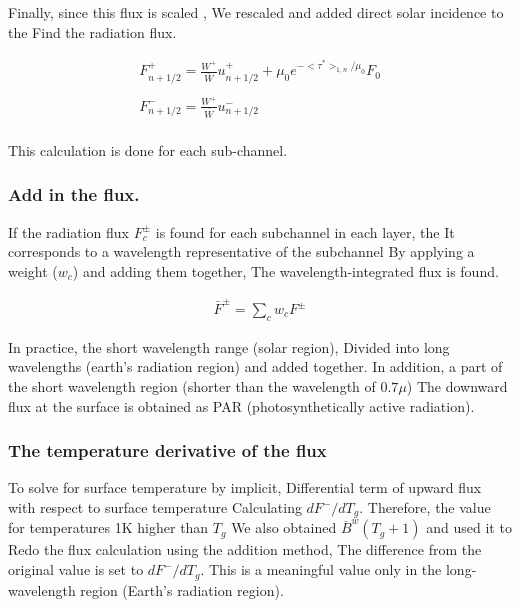 Finally, since this flux is scaled , We rescaled and added direct solar
incidence to the Find the radiation flux.

\begin{eqnarray}
  F^+_{n+1/2}  =  \frac{W^+}{\bar{W}} u^+_{n+1/2} 
                + \mu_0 e^{-<\tau^*>_{1,n}/\mu_0} F_0 \\\\
  F^-_{n+1/2}  =  \frac{W^+}{\bar{W}} u^-_{n+1/2} \\
\end{eqnarray}

This calculation is done for each sub-channel.

\hypertarget{add-in-the-flux.}{%
\subsubsection{Add in the flux.}\label{add-in-the-flux.}}

If the radiation flux \(F^\pm_c\) is found for each subchannel in each
layer, the It corresponds to a wavelength representative of the
subchannel By applying a weight (\(w_c\)) and adding them together, The
wavelength-integrated flux is found.

\begin{eqnarray}
  \bar{F}^\pm = \sum_c w_c F^\pm
\end{eqnarray}

In practice, the short wavelength range (solar region), Divided into
long wavelengths (earth's radiation region) and added together. In
addition, a part of the short wavelength region (shorter than the
wavelength of \(0.7\mu\)) The downward flux at the surface is obtained
as PAR (photosynthetically active radiation).

\hypertarget{the-temperature-derivative-of-the-flux}{%
\subsubsection{The temperature derivative of the
flux}\label{the-temperature-derivative-of-the-flux}}

To solve for surface temperature by implicit, Differential term of
upward flux with respect to surface temperature Calculating
\(dF^-/dT_g\). Therefore, the value for temperatures 1K higher than
\(T_g\) We also obtained \(\overline{B}^w(T_g+1)\) and used it to Redo
the flux calculation using the addition method, The difference from the
original value is set to \(dF^-/dT_g\). This is a meaningful value only
in the long-wavelength region (Earth's radiation region).

